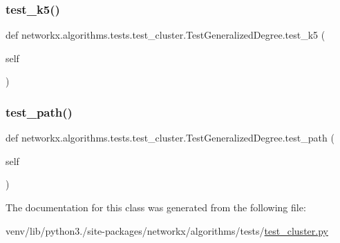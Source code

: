 \subsubsection{\texorpdfstring{test\+\_\+k5()}{test\_k5()}}
{\footnotesize\ttfamily def networkx.\+algorithms.\+tests.\+test\+\_\+cluster.\+Test\+Generalized\+Degree.\+test\+\_\+k5 (\begin{DoxyParamCaption}\item[{}]{self }\end{DoxyParamCaption})}

\mbox{\label{classnetworkx_1_1algorithms_1_1tests_1_1test__cluster_1_1TestGeneralizedDegree_ab949ca731c1b722c699b60a01a1737e6}} 
\subsubsection{\texorpdfstring{test\+\_\+path()}{test\_path()}}
{\footnotesize\ttfamily def networkx.\+algorithms.\+tests.\+test\+\_\+cluster.\+Test\+Generalized\+Degree.\+test\+\_\+path (\begin{DoxyParamCaption}\item[{}]{self }\end{DoxyParamCaption})}



The documentation for this class was generated from the following file\+:\begin{DoxyCompactItemize}
\item 
venv/lib/python3./site-\/packages/networkx/algorithms/tests/\hyperlink{tests_2test__cluster_8py}{test\+\_\+cluster.\+py}\end{DoxyCompactItemize}
